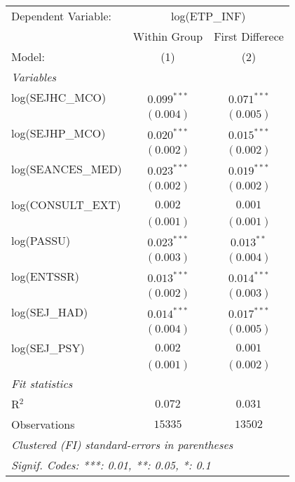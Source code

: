 
\begingroup
\centering
\begin{tabular}{lcc}
   \tabularnewline \midrule \midrule
   Dependent Variable: & \multicolumn{2}{c}{log(ETP\_INF)}                   \\
                       & Within Group                      & First Differece \\
   Model:              & (1)                               & (2)             \\
   \midrule
   \emph{Variables}                                                          \\
   log(SEJHC\_MCO)     & $0.099^{***}$                     & $0.071^{***}$   \\
                       & $(0.004)$                         & $(0.005)$       \\
   log(SEJHP\_MCO)     & $0.020^{***}$                     & $0.015^{***}$   \\
                       & $(0.002)$                         & $(0.002)$       \\
   log(SEANCES\_MED)   & $0.023^{***}$                     & $0.019^{***}$   \\
                       & $(0.002)$                         & $(0.002)$       \\
   log(CONSULT\_EXT)   & $0.002$                           & $0.001$         \\
                       & $(0.001)$                         & $(0.001)$       \\
   log(PASSU)          & $0.023^{***}$                     & $0.013^{**}$    \\
                       & $(0.003)$                         & $(0.004)$       \\
   log(ENTSSR)         & $0.013^{***}$                     & $0.014^{***}$   \\
                       & $(0.002)$                         & $(0.003)$       \\
   log(SEJ\_HAD)       & $0.014^{***}$                     & $0.017^{***}$   \\
                       & $(0.004)$                         & $(0.005)$       \\
   log(SEJ\_PSY)       & $0.002$                           & $0.001$         \\
                       & $(0.001)$                         & $(0.002)$       \\
   \midrule
   \emph{Fit statistics}                                                     \\
   R$^2$               & $0.072$                           & $0.031$         \\
   Observations        & $15335$                           & $13502$         \\
   \midrule \midrule
   \multicolumn{3}{l}{\emph{Clustered (FI) standard-errors in parentheses}}  \\
   \multicolumn{3}{l}{\emph{Signif. Codes: ***: 0.01, **: 0.05, *: 0.1}}     \\
\end{tabular}
\par\endgroup

